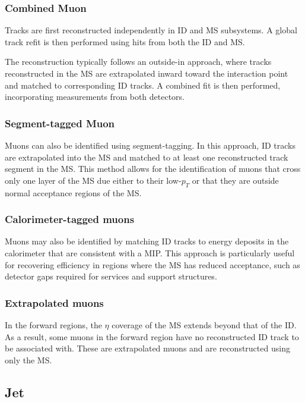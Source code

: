 \subsubsection{Combined Muon}

Tracks are first reconstructed independently in ID and MS subsystems. A global track refit is then performed using hits from both the ID and MS.

The reconstruction typically follows an outside-in approach, where tracks reconstructed in the MS are extrapolated inward toward the interaction point and matched to corresponding ID tracks. A combined fit is then performed, incorporating measurements from both detectors.

 

\subsubsection{Segment-tagged Muon}
Muons can also be identified using segment-tagging. In this approach, ID tracks are extrapolated into the MS and matched to at least one reconstructed track segment in the MS. This method allows for the identification of muons that cross only one layer of the MS due either to their low-$p_T$ or that they are outside normal acceptance regions of the MS.



\subsubsection{Calorimeter-tagged muons}
Muons may also be identified by matching ID tracks to energy deposits in the calorimeter that are consistent with a MIP.
This approach is particularly useful for recovering efficiency in regions where the MS has reduced acceptance, such as detector gaps required for services and support structures.


\subsubsection{Extrapolated muons}
In the forward regions, the $\eta$ coverage of the MS extends beyond that of the ID. As a result, some muons in the forward region have no reconstructed ID track to be associated with. These are extrapolated muons and are reconstructed using only the MS.

\subsection{Jet}

